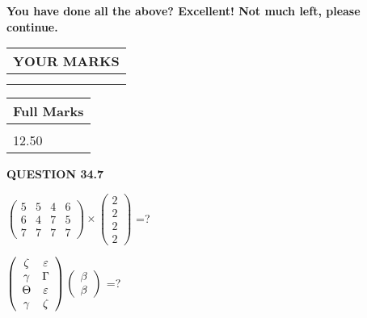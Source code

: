\documentclass[12pt]{article}
\begin{document}
  
 
   
   
\vspace{0.3in}
{\textbf{\LARGE{You have done all the above? Excellent! Not much left, please continue.}}}
\vspace{0.3in}
   
   
  
\vspace{0.2in}
  
\noindent\begin{tabular}{|l|}
\hline
 YOUR MARKS  \\
\hline
 \\ 
 \\ 
\hline
\end{tabular}
\hspace{0.05in} \begin{tabular}{|l|}
\hline
 Full Marks  \\
\hline
 \\ 
12.50 \\
\hline
\end{tabular}
{\textbf{\Large{QUESTION
34.7 
}}}
  
  
 
$ \left( \begin{array}{ccccccccc}
           5 & 
           5 & 
           4 & 
           6 \\ 
           6 & 
           4 & 
           7 & 
           5 \\ 
           7 & 
           7 & 
           7 & 
           7
\end{array}\right) \times
\left( \begin{array}{c}
           2 \\ 
           2 \\ 
           2 \\ 
           2
\end{array}\right) $ =?
 
 
$  %
 \left( \begin{array}
 {
 c
 c
 }
                    \zeta & 
 \varepsilon \\ 
 \gamma & 
 \Gamma \\ 
 \Theta & 
 \varepsilon \\ 
 \gamma & 
                    \zeta
 \end{array} \right)
 \left( \begin{array}
 {
 c
 }
 \beta \\ 
 \beta
 \end{array} \right)
$ =?
 
\end{document}
